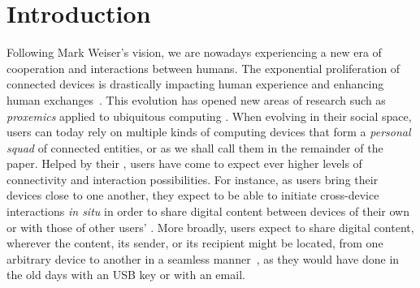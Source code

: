 \section{Introduction}

Following Mark Weiser's vision, we are nowadays
experiencing a new era of cooperation and interactions between humans.
The exponential proliferation of connected devices is
drastically impacting human experience and enhancing human
exchanges~\cite{Dearman:2008, Oh:2017, Sohn:2008,Harper08}. This evolution has opened new areas of research such as
\textit{proxemics} applied to ubiquitous computing
\cite{Marquardt:2011}. When evolving in their social space, users can today rely on
multiple kinds of computing devices that form a \textit{personal squad} of connected entities, or \squad as we shall call them in the remainder of the
paper. Helped by their \squad, users
have come to expect ever higher levels of connectivity and interaction
possibilities. For instance, as users bring
their devices close to one another, they expect to be able to initiate cross-device
interactions \textit{in situ} in order to share digital content
\cite{Oh:2017} between devices of their own \squad or with those of other users' \squad. More broadly, users expect to share digital content,
wherever the content, its sender, or its recipient might be located, from one
arbitrary device to another in a seamless manner~\cite{Dearman:2008}, as they
would have done in the old days with an USB key or with an email. 

